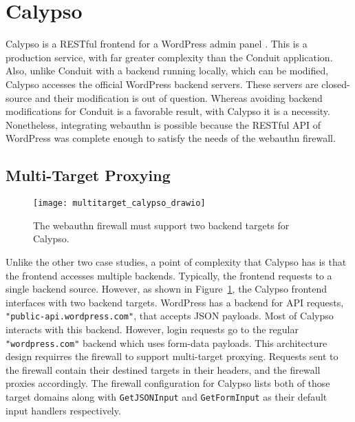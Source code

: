 
\section{Calypso}

Calypso is a RESTful frontend for a WordPress admin panel \cite{TODO-calypso}. This is a production service, with far greater complexity than the Conduit application. Also, unlike Conduit with a backend running locally, which can be modified, Calypso accesses the official WordPress backend servers. These servers are closed-source and their modification is out of question. Whereas avoiding backend modifications for Conduit is a favorable result, with Calypso it is a necessity. Nonetheless, integrating webauthn is possible because the RESTful API of WordPress was complete enough to satisfy the needs of the webauthn firewall.

\subsection{Multi-Target Proxying}

\begin{figure}[h]
  \centering
  \texttt{[image: multitarget\_calypso\_drawio]}
  \caption{The webauthn firewall must support two backend targets for Calypso.}
  \label{Fig:MultiTargetCalypso}
\end{figure}

Unlike the other two case studies, a point of complexity that Calypso has is that the frontend accesses multiple backends. Typically, the frontend requests to a single backend source. However, as shown in Figure~\ref{Fig:MultiTargetCalypso}, the Calypso frontend interfaces with two backend targets. WordPress has a backend for API requests, \lstinline{"public-api.wordpress.com"}, that accepts JSON payloads. Most of Calypso interacts with this backend. However, login requests go to the regular \lstinline{"wordpress.com"} backend which uses form-data payloads. This architecture design requirres the firewall to support multi-target proxying. Requests sent to the firewall contain their destined targets in their headers, and the firewall proxies accordingly. The firewall configuration for Calypso lists both of those target domains along with \lstinline{GetJSONInput} and \lstinline{GetFormInput} as their default input handlers respectively. 

